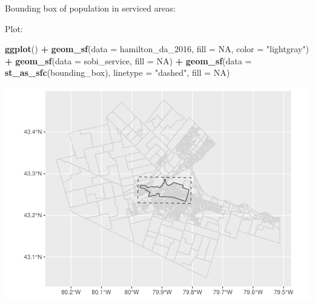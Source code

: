 \documentclass[
]{article}
\newenvironment{Shaded}{\begin{snugshade}}{\end{snugshade}}
\newcommand{\DataTypeTok}[1]{\textcolor[rgb]{0.13,0.29,0.53}{#1}}
\newcommand{\DecValTok}[1]{\textcolor[rgb]{0.00,0.00,0.81}{#1}}
\newcommand{\KeywordTok}[1]{\textcolor[rgb]{0.13,0.29,0.53}{\textbf{#1}}}
\newcommand{\NormalTok}[1]{#1}
\newcommand{\OperatorTok}[1]{\textcolor[rgb]{0.81,0.36,0.00}{\textbf{#1}}}
\newcommand{\OtherTok}[1]{\textcolor[rgb]{0.56,0.35,0.01}{#1}}
\newcommand{\StringTok}[1]{\textcolor[rgb]{0.31,0.60,0.02}{#1}}
\begin{document}
Bounding box of population in serviced areas:

\begin{Shaded}
\end{Shaded}

Plot:

\begin{Shaded}
\begin{Highlighting}[]
\KeywordTok{ggplot}\NormalTok{() }\OperatorTok{+}\StringTok{ }
\StringTok{  }\KeywordTok{geom_sf}\NormalTok{(}\DataTypeTok{data =}\NormalTok{ hamilton_da_}\DecValTok{2016}\NormalTok{,}
          \DataTypeTok{fill =} \OtherTok{NA}\NormalTok{,}
          \DataTypeTok{color =} \StringTok{"lightgray"}\NormalTok{) }\OperatorTok{+}\StringTok{ }
\StringTok{  }\KeywordTok{geom_sf}\NormalTok{(}\DataTypeTok{data =}\NormalTok{ sobi_service,}
          \DataTypeTok{fill =} \OtherTok{NA}\NormalTok{) }\OperatorTok{+}
\StringTok{  }\KeywordTok{geom_sf}\NormalTok{(}\DataTypeTok{data =} \KeywordTok{st_as_sfc}\NormalTok{(bounding_box),}
          \DataTypeTok{linetype =} \StringTok{"dashed"}\NormalTok{,}
          \DataTypeTok{fill =} \OtherTok{NA}\NormalTok{)}
\end{Highlighting}
\end{Shaded}

\includegraphics{00-Data-Processing-Example_files/figure-latex/unnamed-chunk-11-1.pdf}
\end{document}
